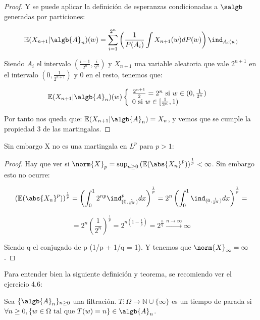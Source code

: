 \documentclass{apuntes}
\begin{document}
\begin{example}
\begin{proof}
Y se puede aplicar la definición de esperanzas condicionadas a $\salgb$ generadas por particiones:

\[
\mathbb{E}(X_{n+1}|\algb{A}_n)(w)=\sum_{i=1}^{2^n}\left( \frac{1}{P(A_i)}\int X_{n+1}(w)dP(w)\right)\ind_{A_i(w)}
\]

Siendo $A_i$ el intervalo $(\frac{i-1}{2^n}, \frac{i}{2^n})$ y $X_{n+1}$ una variable aleatoria que vale $2^{n+1}$ en el intervalo $(0, \frac{1}{2^{n+1}})$ y 0 en el resto, tenemos que:

$$
\mathbb{E}(X_{n+1}|\algb{A}_n)(w)
  \left\lbrace
  \begin{array}{l}
     \frac{2^{n+1}}{2}=2^n \text{ si } w \in (0,\frac{1}{2^n}) \\
     0 \text{ si } w \in [\frac{1}{2^n}, 1) \\
  \end{array}
  \right. \text{   }
$$

Por tanto nos queda que: $\mathbb{E}(X_{n+1}|\algb{A}_n)=X_n$, y vemos que se cumple la propiedad 3 de las martingalas.

\end{proof}

Sin embargo X no es una martingala en $L^p$ para $p>1$:
\begin{proof}
Hay que ver si $\norm{X}_p = \sup_{n\geq 0}\left(\mathbb{E}(\abs{X_n}^p) \right)^\frac{1}{p} < \infty$. Sin embargo esto no ocurre:

\[
\left(\mathbb{E}(\abs{X_n}^p) \right)^\frac{1}{p} = \left(\int_{0}^{1} 2^{np} \ind_{(0,\frac{1}{2^n})}^p dx\right)^\frac{1}{p} = 2^n \left(\int_{0}^{1} \ind_{(0,\frac{1}{2^n})} dx\right)^\frac{1}{p} =
\]

\[
= 2^n \left( \frac{1}{2^n} \right)^\frac{1}{p} = 2^{n(1-\frac{1}{p})} = 2^{\frac{n}{q}} \stackrel{n \rightarrow \infty}{\rightarrow} \infty
\]

Siendo q el conjugado de p (1/p + 1/q = 1). Y tenemos que $\norm{X}_{\infty} = \infty$.
\end{proof}

\end{example}

Para entender bien la siguiente definición y teorema, se recomiendo ver el ejercicio 4.6:

\begin{defn}
Sea $\{\algb{A}_n \}_{n \geq 0}$ una filtración. $T: \Omega \rightarrow \mathbb{N}\cup \{\infty \}$ es un tiempo de parada si $\forall n \geq 0, \{w \in \Omega \text{ tal que } T(w)=n\} \in \algb{A}_n$.
\end{defn}
\end{document}
